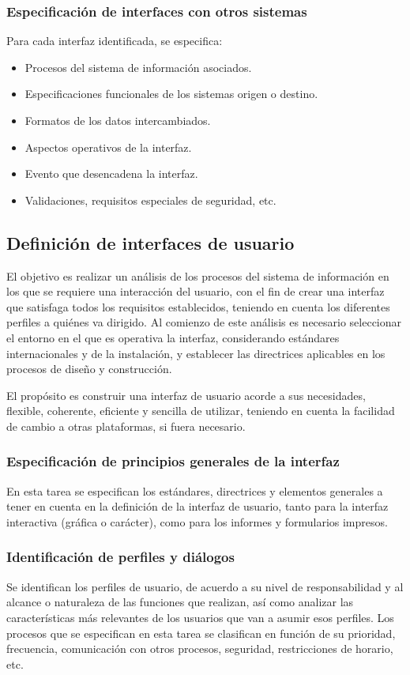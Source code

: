 \documentclass[11pt,a4paper,spanish,twoside]{report}
\begin{document}
\subsubsection{Especificación de interfaces con otros sistemas}
Para cada interfaz identificada, se especifica:
\begin{itemize}
\item Procesos del sistema de información asociados.
\item Especificaciones funcionales de los sistemas origen o destino.
\item Formatos de los datos intercambiados.
\item Aspectos operativos de la interfaz.
\item Evento que desencadena la interfaz.
\item Validaciones, requisitos especiales de seguridad, etc.
\end{itemize}

\subsection{Definición de interfaces de usuario}
El objetivo es realizar un análisis de los procesos del sistema de
información en los que se requiere una interacción del usuario, con el fin de
crear una interfaz que satisfaga todos los requisitos establecidos, teniendo
en cuenta los diferentes perfiles a quiénes va dirigido.
Al comienzo de este análisis es necesario seleccionar el entorno en el que es
operativa la interfaz, considerando estándares internacionales y de la
instalación, y establecer las directrices aplicables en los procesos de
diseño y construcción. 

El propósito es construir una interfaz de usuario acorde a sus necesidades,
flexible, coherente, eficiente y sencilla de utilizar, teniendo en cuenta la
facilidad de cambio a otras plataformas, si fuera necesario. 

\subsubsection{Especificación de principios generales de la interfaz}
En esta tarea se especifican los estándares, directrices y elementos
generales a tener en cuenta en la definición de la interfaz de usuario, tanto
para la interfaz interactiva (gráfica o carácter), como para los informes y
formularios impresos. 

\subsubsection{Identificación de perfiles y diálogos}
Se identifican los perfiles de usuario, de acuerdo a su nivel de
responsabilidad y al alcance o naturaleza de las funciones que realizan, así
como analizar las características más relevantes de los usuarios que van a
asumir esos perfiles. 
Los procesos que se especifican en esta tarea se clasifican en función de su
prioridad, frecuencia, comunicación con otros procesos, seguridad,
restricciones de horario, etc.
\end{document}
